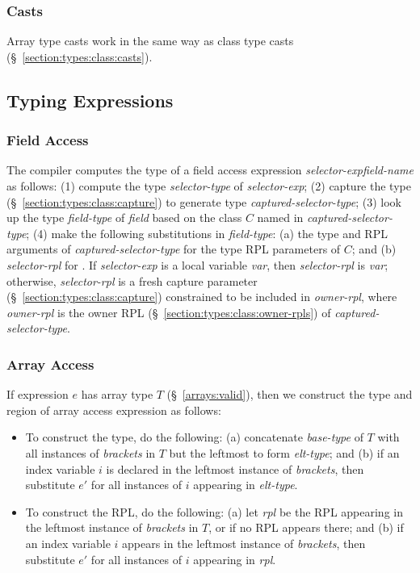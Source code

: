 \subsubsection{Casts}

Array type casts work in the same way as class type casts
(\S~\ref{section:types:class:casts}).

\subsection{Typing Expressions}

\subsubsection{Field Access}
\label{section:types:exp:field}

The compiler computes the type of a field access expression
\emph{selector-exp}\emph{field-name} as follows: (1) compute
the type \emph{selector-type} of \emph{selector-exp}; (2) capture the
type (\S~\ref{section:types:class:capture}) to generate type
\emph{captured-selector-type}; (3) look up the type \emph{field-type}
of \emph{field} based on the class $C$ named in
\emph{captured-selector-type}; (4) make the following substitutions in
\emph{field-type}: (a) the type and RPL arguments of
\emph{captured-selector-type} for the type RPL parameters of $C$; and
(b) \emph{selector-rpl} for .  If \emph{selector-exp} is a
 local variable \emph{var}, then \emph{selector-rpl} is
\emph{var}; otherwise, \emph{selector-rpl} is a fresh capture
parameter (\S~\ref{section:types:class:capture}) constrained to be
included in \emph{owner-rpl}\kwd{:*}, where \emph{owner-rpl} is the
owner RPL (\S~\ref{section:types:class:owner-rpls}) of
\emph{captured-selector-type}.

\subsubsection{Array Access}
\label{section:types:exp:array}

If expression $e$ has array type $T$ (\S~\ref{arrays:valid}), then we
construct the type and region of array access expression
 as follows:
\begin{itemize}
\item To construct the type, do the following: (a) concatenate
  \emph{base-type} of $T$ with all instances of \emph{brackets} in $T$
  but the leftmost to form \emph{elt-type}; and (b) if an index
  variable $i$ is declared in the leftmost instance of
  \emph{brackets}, then substitute $e'$ for all instances of $i$
  appearing in \emph{elt-type}.
\item To construct the RPL, do the following: (a) let \emph{rpl} be
  the RPL appearing in the leftmost instance of \emph{brackets} in
  $T$, or  if no RPL appears there; and (b) if an index
  variable $i$ appears in the leftmost instance of \emph{brackets},
  then substitute $e'$ for all instances of $i$ appearing in
  \emph{rpl}.
\end{itemize}

